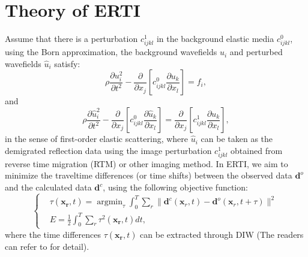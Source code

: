 \documentclass[extra,mreferee]{gji}
\begin{document}
\section{Theory of ERTI}
Assume that there is a perturbation $c^{1}_{ijkl}$ in the background elastic media
$c^0_{ijkl}$, using the Born approximation, the background wavefields $u_i$ and perturbed wavefields
$\hat{u}_i$ satisfy:
\begin{equation}
    \rho \frac{\partial u^2_i}{\partial t^2}  -
    \frac{\partial}{\partial x_j}\left[ 
        c^0_{ijkl}\frac{\partial u_{k}}{\partial
        x_l}\right]=f_i,
    \label{eq:WE} 
\end{equation}
and
\begin{equation}
	\rho \frac{\partial \hat{u}^2_i}{\partial t^2}  -
    \frac{\partial}{\partial x_j}\left[ 
	c^0_{ijkl}\frac{\partial \hat{u}_{k}}{\partial
        x_l}\right]=\frac{\partial}{\partial x_j}\left[c^1_{ijkl}\frac{\partial u_{k}}{\partial x_l}\right],
    \label{eq:DeltaWE} 
\end{equation}
in the sense of first-order elastic scattering, where $\hat{u}_i$ can be taken as the demigrated reflection data using the image
perturbation $c^1_{ijkl}$ obtained from reverse time migration (RTM) or other imaging method. In ERTI, we
aim to minimize the traveltime differences (or time shifts) between the observed data
$\mathbf{d}^{o}$ and
the calculated data $\mathbf{d}^{c}$, using the following  
objective function: 
\begin{equation}
	\left\{
		\begin{aligned}
			&\tau(\mathbf{x_r},t)=\mathop{\arg\min}_{\tau}
			\int^T_0\sum_r\parallel\mathbf{d}^{c}(\mathbf{x}_r,t)-\mathbf{d}^{o}(\mathbf{x}_r,t+\tau)\parallel^2\\
    &E=\frac{1}{2}\int^T_0\sum_r\tau^2(\mathbf{x_r},t)dt,
		\end{aligned}
	\right.
    \label{eq:Objectivefunction} 
\end{equation}
where the time differences $\tau(\mathbf{x_r},t)$ can be extracted
through DIW (The readers can refer to \cite{Hale2013} for detail).
\end{document}
